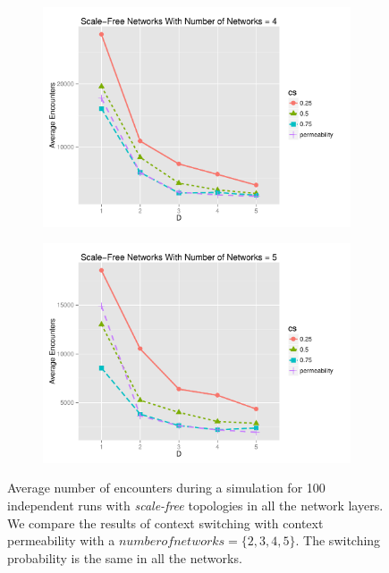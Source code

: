 \documentclass[preprint,number]{elsarticle}
\begin{document}
\begin{figure}[H]
\begin{subfigure}{.49\linewidth}
          \centering
          \includegraphics[width=1\linewidth]{"../analysis/pdf/context_switching_encounters_comp_sf_groupedbynets_4"}
          \caption{}
          \label{fig:ctx_switching_comp_sf_4}
	\end{subfigure}
	\begin{subfigure}{.5\linewidth}
          \centering
          \includegraphics[width=1\linewidth]{"../analysis/pdf/context_switching_encounters_comp_sf_groupedbynets_5"}
          \caption{}
          \label{fig:ctx_switching_comp_sf_5}
	\end{subfigure}
	\begin{minipage}{0.9\textwidth}
          \vspace{0.2cm}
          \caption{Average number of encounters during a simulation for 100 independent runs with
            \textit{scale-free} topologies in all the network layers. We compare the results of
            context switching with context permeability with a $number of networks =
            \{2,3,4,5\}$. The switching probability is the same in all the networks.}
          \label{fig:ctx_switching_comp_sf}
	\end{minipage}
      \end{figure}
\end{document}
